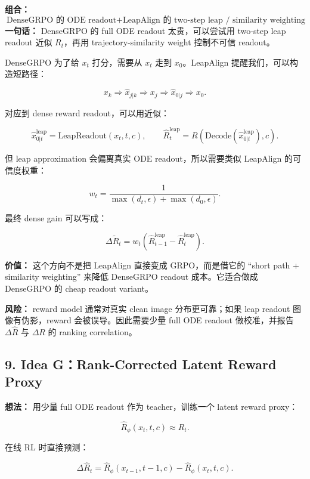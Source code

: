 \begin{conceptbox}
\textbf{组合：}
\[
\text{DenseGRPO 的 ODE readout}
+ \text{LeapAlign 的 two-step leap / similarity weighting}
\]
\textbf{一句话：} DenseGRPO 的 full ODE readout 太贵，可以尝试用 two-step leap readout 近似 \(R_t\)，再用 trajectory-similarity weight 控制不可信 readout。
\end{conceptbox}

DenseGRPO 为了给 \(x_t\) 打分，需要从 \(x_t\) 走到 \(x_0\)。LeapAlign 提醒我们，可以构造短路径：

\[
x_k
\Rightarrow
\hat{x}_{j|k}
\Rightarrow
x_j
\Rightarrow
\hat{x}_{0|j}
\Rightarrow
x_0.
\]

对应到 dense reward readout，可以用近似：

\[
\hat{x}_{0|t}^{\mathrm{leap}}
=
\mathrm{LeapReadout}(x_t,t,c),
\qquad
\hat{R}_t^{\mathrm{leap}}
=R(\mathrm{Decode}(\hat{x}_{0|t}^{\mathrm{leap}}),c).
\]

但 leap approximation 会偏离真实 ODE readout，所以需要类似 LeapAlign 的可信度权重：

\[
w_t
=
\frac{1}{\max(d_t,\epsilon)+\max(d_0,\epsilon)}.
\]

最终 dense gain 可以写成：

\[
\Delta \tilde{R}_t
=
w_t\left(\hat{R}_{t-1}^{\mathrm{leap}}-\hat{R}_{t}^{\mathrm{leap}}\right).
\]

\begin{summarybox}
\textbf{价值：} 这个方向不是把 LeapAlign 直接变成 GRPO，而是借它的 ``short path + similarity weighting'' 来降低 DenseGRPO readout 成本。它适合做成 DenseGRPO 的 cheap readout variant。
\end{summarybox}

\textbf{风险：} reward model 通常对真实 clean image 分布更可靠；如果 leap readout 图像有伪影，reward 会被误导。因此需要少量 full ODE readout 做校准，并报告 \(\Delta \hat{R}\) 与 \(\Delta R\) 的 ranking correlation。

\subsection{9. Idea G：Rank-Corrected Latent Reward Proxy}

\textbf{想法：} 用少量 full ODE readout 作为 teacher，训练一个 latent reward proxy：

\[
\hat{R}_{\phi}(x_t,t,c)\approx R_t.
\]

在线 RL 时直接预测：

\[
\Delta \hat{R}_t
=
\hat{R}_{\phi}(x_{t-1},t-1,c)-\hat{R}_{\phi}(x_t,t,c).
\]

